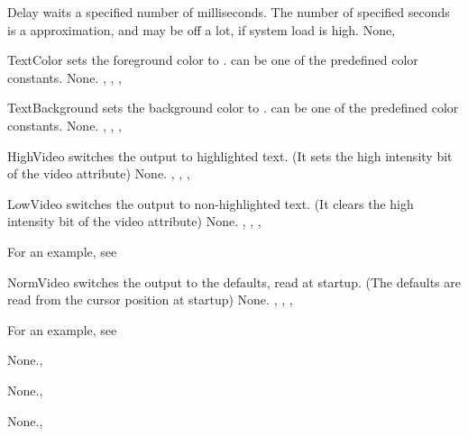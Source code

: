 

{Delay waits a specified number of milliseconds. The number of specified
seconds is a approximation, and may be off a lot, if system load is high.}
{None}{, }



{
TextColor sets the foreground color to .  can be one of the
predefined color constants.
}
{None.}{ , , ,
}



{
TextBackground sets the background color to .  can be one of the
predefined color constants.
}
{None.}{ , , ,
}



{ HighVideo switches the output to highlighted text. (It sets the high
intensity bit of the video attribute)
}
{None.}{ , , ,
}



{ LowVideo switches the output to non-highlighted text. (It clears the high
intensity bit of the video attribute)
}
{None.}{ , , ,
}

For an example, see 

{ NormVideo switches the output to the defaults, read at startup. (The
defaults are read from the cursor position at startup)
}
{None.}{ , , ,
}

For an example, see 

{None.}{, }

{None.}{, }

{None.}{, }

